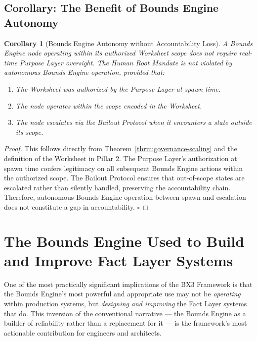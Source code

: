 \documentclass[12pt]{article}
\theoremstyle{plain}
\newtheorem{corol}[thrm]{Corollary}
\begin{document}
\subsection{Corollary: The Benefit of Bounds Engine Autonomy}\label{corol:autonomy}

\begin{corol}[Bounds Engine Autonomy without Accountability Loss]\label{corol:autonomy-benefit}
A Bounds Engine node operating within its authorized Worksheet scope does not require real-time Purpose Layer oversight. The Human Root Mandate is not violated by autonomous Bounds Engine operation, provided that:
\begin{enumerate}[noitemsep]
    \item The Worksheet was authorized by the Purpose Layer at spawn time.
    \item The node operates within the scope encoded in the Worksheet.
    \item The node escalates via the Bailout Protocol when it encounters a state outside its scope.
\end{enumerate}
\end{corol}

\begin{proof}
This follows directly from Theorem~\ref{thrm:governance-scaling} and the definition of the Worksheet in Pillar 2. The Purpose Layer's authorization at spawn time confers legitimacy on all subsequent Bounds Engine actions within the authorized scope. The Bailout Protocol ensures that out-of-scope states are escalated rather than silently handled, preserving the accountability chain. Therefore, autonomous Bounds Engine operation between spawn and escalation does not constitute a gap in accountability. $\square$
\end{proof}


\section{The Bounds Engine Used to Build and Improve Fact Layer Systems}
\label{sec:building}

One of the most practically significant implications of the BX3 Framework is that the Bounds Engine's most powerful and appropriate use may not be \textit{operating} within production systems, but \textit{designing and improving} the Fact Layer systems that do. This inversion of the conventional narrative --- the Bounds Engine as a builder of reliability rather than a replacement for it --- is the framework's most actionable contribution for engineers and architects.
\end{document}
